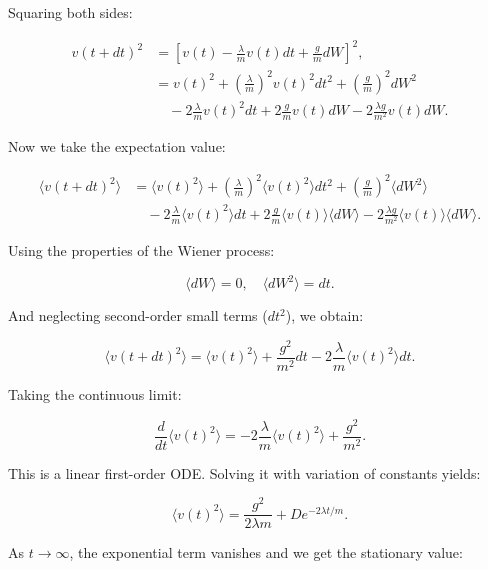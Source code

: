 Squaring both sides:

\begin{align}
  v(t + dt)^2 &= \left[ v(t) - \frac{\lambda}{m} v(t) dt + \frac{g}{m} dW \right]^2 \text{,}\\
              &= v(t)^2 + \left( \frac{\lambda}{m} \right)^2 v(t)^2 dt^2 + \left( \frac{g}{m} \right)^2 dW^2 \nonumber \\
              &\quad - 2 \frac{\lambda}{m} v(t)^2 dt + 2 \frac{g}{m} v(t) dW - 2 \frac{\lambda g}{m^2} v(t) dW \text{.}
\end{align}

Now we take the expectation value:

\begin{align}
  \langle v(t + dt)^2 \rangle &= \langle v(t)^2 \rangle + \left( \frac{\lambda}{m} \right)^2 \langle v(t)^2 \rangle dt^2 + \left( \frac{g}{m} \right)^2 \langle dW^2 \rangle \nonumber \\
                              &\quad - 2 \frac{\lambda}{m} \langle v(t)^2 \rangle dt + 2 \frac{g}{m} \langle v(t) \rangle \langle dW \rangle - 2 \frac{\lambda g}{m^2} \langle v(t) \rangle \langle dW \rangle \text{.}
\end{align}

Using the properties of the Wiener process:

\[
  \langle dW \rangle = 0, \quad \langle dW^2 \rangle = dt \text{.}
\]

And neglecting second-order small terms (\( dt^2 \)), we obtain:

\begin{equation}
  \langle v(t + dt)^2 \rangle = \langle v(t)^2 \rangle + \frac{g^2}{m^2} dt - 2 \frac{\lambda}{m} \langle v(t)^2 \rangle dt \text{.}
\end{equation}

Taking the continuous limit:

\begin{equation}
  \frac{d}{dt} \langle v(t)^2 \rangle = -2 \frac{\lambda}{m} \langle v(t)^2 \rangle + \frac{g^2}{m^2} \text{.}
\end{equation}

This is a linear first-order ODE. Solving it with variation of constants yields:

\begin{equation}
  \langle v(t)^2 \rangle = \frac{g^2}{2 \lambda m} + D e^{-2 \lambda t / m} \text{.}
\end{equation}

As \( t \to \infty \), the exponential term vanishes and we get the stationary value:

